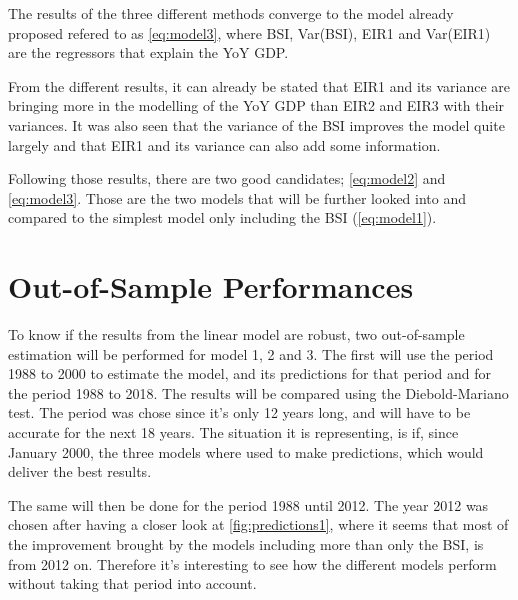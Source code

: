 \documentclass[12pt,a4paper,oneside]{book}
\begin{document}
The results of the three different methods converge to the model already proposed refered to as \ref{eq:model3}, where BSI, Var(BSI), EIR1 and Var(EIR1) are the regressors that explain the YoY GDP.

From the different results, it can already be stated that EIR1 and its variance are bringing more in the modelling of the YoY GDP than EIR2 and EIR3 with their variances.
It was also seen that the variance of the BSI improves the model quite largely and that EIR1 and its variance can also add some information.

Following those results, there are two good candidates; \autoref{eq:model2} and \ref{eq:model3}. Those are the two models that will be further looked into and compared to the simplest model only including the BSI (\autoref{eq:model1}).


\section{Out-of-Sample Performances}

To know if the results from the linear model are robust, two out-of-sample estimation will be performed for model 1, 2 and 3.
The first will use the period 1988 to 2000 to estimate the model, and its predictions for that period and for the period 1988 to 2018. The results will be compared using the Diebold-Mariano test.
The period was chose since it's only 12 years long, and will have to be accurate for the next 18 years. The situation it is representing, is if, since January 2000, the three models where used to make predictions, which would deliver the best results.


The same will then be done for the period 1988 until 2012. The year 2012 was chosen after having a closer look at \autoref{fig:predictions1}, where it seems that most of the improvement brought by the models including more than only the BSI, is from 2012 on. Therefore it's interesting to see how the different models perform without taking that period into account.

\end{document}
